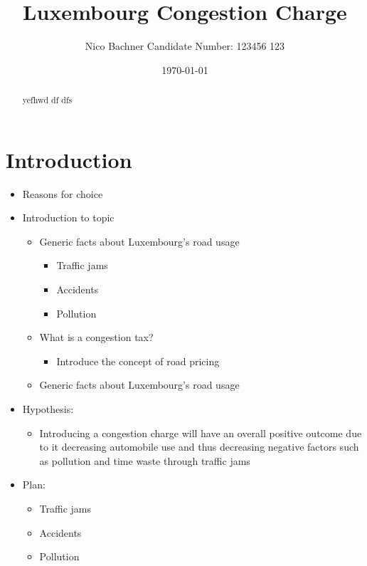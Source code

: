 \documentclass[
      a4paper,
        12pt,
          oneside,
      ]{article}
\title{
    Luxembourg Congestion Charge
      }
\author{
          Nico Bachner \textbar{} Candidate Number: 123456 123
        }
\date{\today}
\providecommand{\tightlist}{
  \setlength{\itemsep}{0pt}
  \setlength{\parskip}{0pt}
}
\begin{document}
\maketitle

  \begin{abstract}
    yefhwd df dfs
  \end{abstract}




\maketitle
\thispagestyle{empty}
\newpage
\tableofcontents
\newpage

\hypertarget{introduction}{%
\section{Introduction}\label{introduction}}

\begin{itemize}
\tightlist
\item
  Reasons for choice
\item
  Introduction to topic

  \begin{itemize}
  \tightlist
  \item
    Generic facts about Luxembourg's road usage

    \begin{itemize}
    \tightlist
    \item
      Traffic jams
    \item
      Accidents
    \item
      Pollution
    \end{itemize}
  \item
    What is a congestion tax?

    \begin{itemize}
    \tightlist
    \item
      Introduce the concept of road pricing
    \end{itemize}
  \item
    Generic facts about Luxembourg's road usage
  \end{itemize}
\item
  Hypothesis:

  \begin{itemize}
  \tightlist
  \item
    Introducing a congestion charge will have an overall positive
    outcome due to it decreasing automobile use and thus decreasing
    negative factors such as pollution and time waste through traffic
    jams
  \end{itemize}
\item
  Plan:

  \begin{itemize}
  \tightlist
  \item
    Traffic jams
  \item
    Accidents
  \item
    Pollution
  \end{itemize}
\end{itemize}
\end{document}
